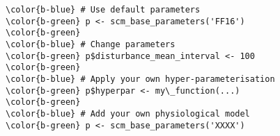 \documentclass[class=minimal,border=0]{standalone}
\begin{document}
%
\begin{BVerbatim}
\color{b-blue} # Use default parameters
\color{b-green} p <- scm_base_parameters('FF16')
\color{b-green}
\color{b-blue} # Change parameters
\color{b-green} p$disturbance_mean_interval <- 100
\color{b-green}
\color{b-blue} # Apply your own hyper-parameterisation
\color{b-green} p$hyperpar <- my\_function(...)
\color{b-green}
\color{b-blue} # Add your own physiological model
\color{b-green} p <- scm_base_parameters('XXXX')
\end{BVerbatim}
\end{document}
